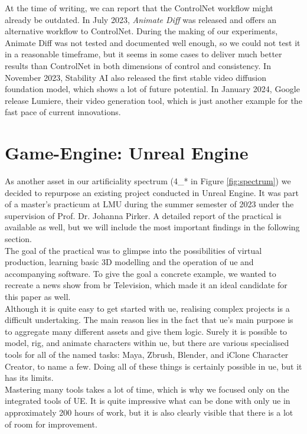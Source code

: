 \documentclass[
  a4paper,  %
  twoside,  %
  bibliography=totoc,
  headsepline,
  cleardoublepage=empty,
  parskip=half,
  draft=false
]{scrbook}
\begin{document}
At the time of writing, we can report that the ControlNet workflow might already be outdated. In July 2023, \textit{Animate Diff} was released and offers an alternative workflow to ControlNet. During the making of our experiments, Animate Diff was not tested and documented well enough, so we could not test it in a reasonable timeframe, but it seems in some cases to deliver much better results than ControlNet in both dimensions of control and consistency. In November 2023, Stability AI also released the first stable video diffusion foundation model, which shows a lot of future potential. In January 2024, Google release Lumiere, their video generation tool, which is just another example for the fast pace of current innovations.

\section{Game-Engine: Unreal Engine}
As another asset in our artificiality spectrum (4\_* in Figure \ref{fig:spectrum}) we decided to repurpose an existing project conducted in Unreal Engine. It was part of a master's practicum at LMU during the summer semester of 2023 under the supervision of Prof. Dr. Johanna Pirker. A detailed report of the practical is available as well, but we will include the most important findings in the following section. \\
The goal of the practical was to glimpse into the possibilities of virtual production, learning basic 3D modelling and the operation of \gls{ue} and accompanying software. To give the goal a concrete example, we wanted to recreate a news show from \gls{br} Television, which made it an ideal candidate for this paper as well. \\
Although it is quite easy to get started with \gls{ue}, realising complex projects is a difficult undertaking. The main reason lies in the fact that \gls{ue}'s main purpose is to aggregate many different assets and give them logic. Surely it is possible to model, rig, and animate characters within \gls{ue}, but there are various specialised tools for all of the named tasks: Maya, Zbrush, Blender, and iClone Character Creator, to name a few. Doing all of these things is certainly possible in \gls{ue}, but it has its limits. \\
Mastering many tools takes a lot of time, which is why we focused only on the integrated tools of UE. It is quite impressive what can be done with only \gls{ue} in approximately 200 hours of work, but it is also clearly visible that there is a lot of room for improvement. \\
\end{document}
